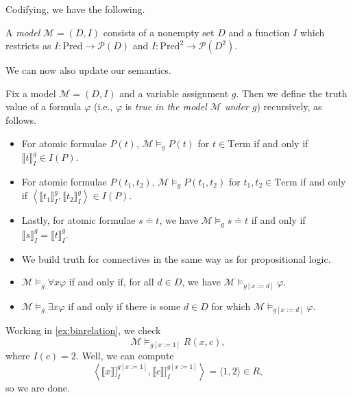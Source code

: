 \documentclass[../notes.tex]{subfiles}
\begin{document}
Codifying, we have the following.
\begin{defihelper}[Model]
	A \textit{model} $\mathcal M=(D,I)$ consists of a nonempty set $D$ and a function $I$ which restricts as $I:\mathrm{Pred}\to\mathcal P(D)$ and $I:\mathrm{Pred}^2\to\mathcal P\left(D^2\right)$.
\end{defihelper}
We can now also update our semantics.
\begin{defihelper}[Truth]
	Fix a model $\mathcal M=(D,I)$ and a variable assignment $g$. Then we define the truth value of a formula $\varphi$ (i.e., $\varphi$ is \textit{true in the model $\mathcal M$ under $g$}) recursively, as follows.
	\begin{itemize}
		\item For atomic formulae $P(t)$, $\mathcal M\models_gP(t)$ for $t\in\mathrm{Term}$ if and only if $\llbracket t\rrbracket_I^g\in I(P)$.
		\item For atomic formulae $P(t_1,t_2)$, $\mathcal M\models_gP(t_1,t_2)$ for $t_1,t_2\in\mathrm{Term}$ if and only if $\left\langle\llbracket t_1\rrbracket_I^g,\llbracket t_2\rrbracket_I^g\right\rangle\in I(P)$.
		\item Lastly, for atomic formulae $s\doteq t$, we have $\mathcal M\models_gs\doteq t$ if and only if $\llbracket s\rrbracket_I^g=\llbracket t\rrbracket_I^g$.
		\item We build truth for connectives in the same way as for propositional logic.
		\item $\mathcal M\models_g\forall x\varphi$ if and only if, for all $d\in D$, we have $\mathcal M\models_{g[x:=d]}\varphi$.
		\item $\mathcal M\models_g\exists x\varphi$ if and only if there is some $d\in D$ for which $\mathcal M\models_{g[x:=d]}\varphi$.
	\end{itemize}
\end{defihelper}
\begin{example}
	Working in \autoref{ex:binrelation}, we check
	\[\mathcal M\models_{g{[x:=1]}}R(x,c),\]
	where $I(c)=2$. Well, we can compute
	\[\left\langle\llbracket x\rrbracket]_I^{g[x:=1]},\llbracket c\rrbracket]_I^{g[x:=1]}\right\rangle=\langle1,2\rangle\in R,\]
	so we are done.
\end{example}
\end{document}
